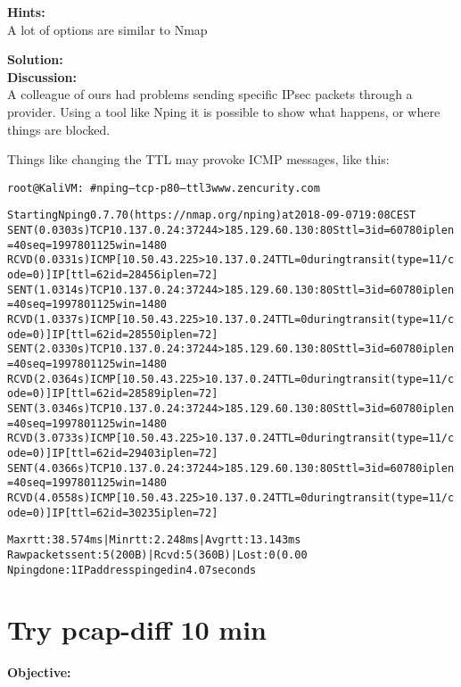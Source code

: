 \documentclass[a4paper,11pt,notitlepage]{report}
\begin{document}
{\bf Hints:} \\
A lot of options are similar to Nmap

{\bf Solution:}\\


{\bf Discussion:}\\
A colleague of ours had problems sending specific IPsec packets through a provider. Using a tool like Nping it is possible to show what happens, or where things are blocked.

Things like changing the TTL may provoke ICMP messages, like this:
\begin{alltt}\footnotesize
root@KaliVM:~# nping --tcp -p 80 --ttl 3 www.zencurity.com

Starting Nping 0.7.70 ( https://nmap.org/nping ) at 2018-09-07 19:08 CEST
SENT (0.0303s) TCP 10.137.0.24:37244 > 185.129.60.130:80 S ttl=3 id=60780 iplen=40  seq=1997801125 win=1480
RCVD (0.0331s) ICMP [10.50.43.225 > 10.137.0.24 TTL=0 during transit (type=11/code=0) ] IP [ttl=62 id=28456 iplen=72 ]
SENT (1.0314s) TCP 10.137.0.24:37244 > 185.129.60.130:80 S ttl=3 id=60780 iplen=40  seq=1997801125 win=1480
RCVD (1.0337s) ICMP [10.50.43.225 > 10.137.0.24 TTL=0 during transit (type=11/code=0) ] IP [ttl=62 id=28550 iplen=72 ]
SENT (2.0330s) TCP 10.137.0.24:37244 > 185.129.60.130:80 S ttl=3 id=60780 iplen=40  seq=1997801125 win=1480
RCVD (2.0364s) ICMP [10.50.43.225 > 10.137.0.24 TTL=0 during transit (type=11/code=0) ] IP [ttl=62 id=28589 iplen=72 ]
SENT (3.0346s) TCP 10.137.0.24:37244 > 185.129.60.130:80 S ttl=3 id=60780 iplen=40  seq=1997801125 win=1480
RCVD (3.0733s) ICMP [10.50.43.225 > 10.137.0.24 TTL=0 during transit (type=11/code=0) ] IP [ttl=62 id=29403 iplen=72 ]
SENT (4.0366s) TCP 10.137.0.24:37244 > 185.129.60.130:80 S ttl=3 id=60780 iplen=40  seq=1997801125 win=1480
RCVD (4.0558s) ICMP [10.50.43.225 > 10.137.0.24 TTL=0 during transit (type=11/code=0) ] IP [ttl=62 id=30235 iplen=72 ]

Max rtt: 38.574ms | Min rtt: 2.248ms | Avg rtt: 13.143ms
Raw packets sent: 5 (200B) | Rcvd: 5 (360B) | Lost: 0 (0.00%)
Nping done: 1 IP address pinged in 4.07 seconds
\end{alltt}


\chapter{Try pcap-diff 10 min}
\label{ex:pcap-diff}

{\bf Objective:}\\
\end{document}
